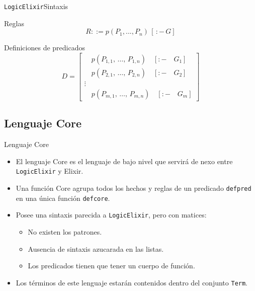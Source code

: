 \documentclass[14pt,aspectratio=169]{beamer}
\begin{document}
\begin{frame}{\texttt{LogicElixir}}{Sintaxis}
  \begin{block}{Reglas}
    \begin{equation*}
      R ::= p(P_1, ..., P_n)\,[\,:-\, G]
    \end{equation*}
  \end{block}
  \begin{block}{Definiciones de predicados}
    \begin{equation*}
      D =
      \begin{bmatrix}
        \quad p(P_{1,1},\, \ldots,\, P_{1,n}) \quad [:- \quad G_1]\\
        \quad p(P_{2,1},\, \ldots,\, P_{2,n}) \quad [:- \quad G_2]\\
        \vdots \\
        \quad p(P_{m,1},\, \ldots,\, P_{m,n}) \quad [:- \quad G_m]
      \end{bmatrix}
    \end{equation*}
  \end{block}
\end{frame}

\subsection{Lenguaje Core}
\begin{frame}{Lenguaje Core}
  \begin{itemize}
    \item El lenguaje Core es el lenguaje de bajo nivel que servirá de nexo
    entre \texttt{LogicElixir} y Elixir.
    \item Una función Core agrupa todos los hechos y reglas de un predicado
    \texttt{defpred} en una única función \texttt{defcore}.
    \item Posee una sintaxis parecida a \texttt{LogicElixir}, pero con matices:
    \begin{itemize}
      \item No existen los patrones.
      \item Ausencia de sintaxis azucarada en las listas.
      \item Los predicados tienen que tener un cuerpo de función.
    \end{itemize}
    \item Los términos de este lenguaje estarán contenidos dentro del conjunto
    \texttt{Term}.
  \end{itemize}
\end{frame}
\end{document}
